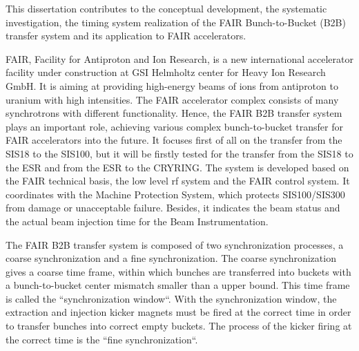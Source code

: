 This dissertation contributes to the conceptual development, the systematic investigation, the timing system realization of the FAIR Bunch-to-Bucket (B2B) transfer system and its application to FAIR accelerators. 

FAIR, Facility for Antiproton and Ion Research, is a new international accelerator facility under construction at GSI Helmholtz center for Heavy Ion Research GmbH. It is aiming at providing high-energy beams of ions from antiproton to uranium with high intensities. The FAIR accelerator complex consists of many synchrotrons with different functionality. Hence, the FAIR B2B transfer system plays an important role, achieving various complex bunch-to-bucket transfer for FAIR accelerators into the future. It focuses first of all on the transfer from the SIS18 to the SIS100, but it will be firstly tested for the transfer from the SIS18 to the ESR and from the ESR to the CRYRING. The system is developed based on the FAIR technical basis, the low level rf system and the FAIR control system. It coordinates with the Machine Protection System, which protects SIS100/SIS300 from damage or unacceptable failure. Besides, it indicates the beam status and the actual beam injection time for the Beam Instrumentation. 
 
The FAIR B2B transfer system is composed of two synchronization processes, a coarse synchronization and a fine synchronization. The coarse synchronization gives a coarse time frame, within which bunches are transferred into buckets with a bunch-to-bucket center mismatch smaller than a upper bound. This time frame is called the ``synchronization window``. With the synchronization window, the extraction
and injection kicker magnets must be fired at the correct time in order to transfer bunches into correct empty buckets. The process of the kicker firing at the correct time is the ``fine synchronization``. 


